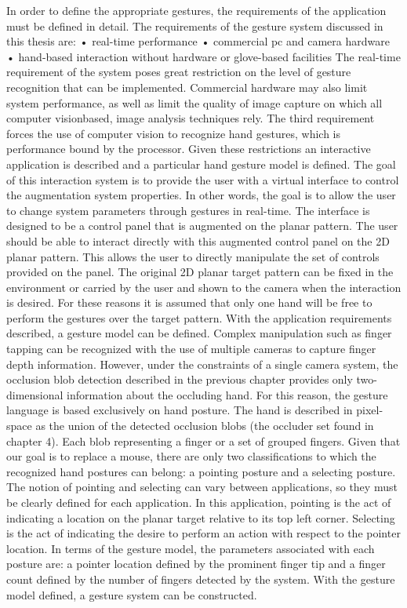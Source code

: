 In order to define the appropriate gestures, the requirements of the application must be defined in detail. The requirements of the gesture system discussed in this thesis are: • real-time performance • commercial pc and camera hardware • hand-based interaction without hardware or glove-based facilities The real-time requirement of the system poses great restriction on the level of gesture recognition that can be implemented. Commercial hardware may also limit system performance, as well as limit the quality of image capture on which all computer visionbased, image analysis techniques rely. The third requirement forces the use of computer vision to recognize hand gestures, which is performance bound by the processor. Given these restrictions an interactive application is described and a particular hand gesture model is defined. The goal of this interaction system is to provide the user with a virtual interface to control the augmentation system properties. In other words, the goal is to allow the user to change system parameters through gestures in real-time. The interface is designed to be a control panel that is augmented on the planar pattern. The user should be able to interact directly with this augmented control panel on the 2D planar pattern. This allows the user to directly manipulate the set of controls provided on the panel. The original 2D planar target pattern can be fixed in the environment or carried by the user and shown to the camera when the interaction is desired. For these reasons it is assumed that only one hand will be free to perform the gestures over the target pattern. With the application requirements described, a gesture model can be defined. Complex manipulation such as finger tapping can be recognized with the use of multiple cameras to capture finger depth information. However, under the constraints of a single camera system, the occlusion blob detection described in the previous chapter provides only two-dimensional information about the occluding hand. For this reason, the gesture language is based exclusively on hand posture. The hand is described in pixel-space as the union of the detected occlusion blobs (the occluder set found in chapter 4). Each blob representing a finger or a set of grouped fingers. Given that our goal is to replace a mouse, there are only two classifications to which the recognized hand postures can belong: a pointing posture and a selecting posture. The notion of pointing and selecting can vary between applications, so they must be clearly defined for each application. In this application, pointing is the act of indicating a location on the planar target relative to its top left corner. Selecting is the act of indicating the desire to perform an action with respect to the pointer location. In terms of the gesture model, the parameters associated with each posture are: a pointer location defined by the prominent finger tip and a finger count defined by the number of fingers detected by the system. With the gesture model defined, a gesture system can be constructed.

